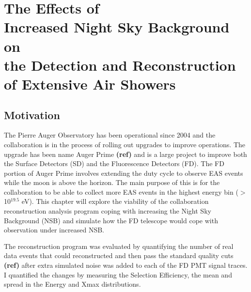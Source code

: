 \chapter[The Effects of Increased NSB on the Detection and Reconstruction of EAS]{\centering The Effects of \\ Increased Night Sky Background on \\ the Detection and Reconstruction \\ of Extensive Air Showers \\}\label{Ch:SelectEff}




\section{Motivation}

The Pierre Auger Observatory has been operational since 2004 and the collaboration  is in the process of rolling out upgrades to improve operations. The upgrade has been name Auger Prime \textbf{(ref)} and is a large project to improve both the Surface Detectors (SD) and the Fluorescence Detectors (FD). The FD portion of Auger Prime involves extending the duty cycle to observe EAS events while the moon is above the horizon. The main purpose of this is for the collaboration to be able to collect more EAS events in the highest energy bin ($>$ 10$^{19.5}$ eV). This chapter will explore the viability of the collaboration reconstruction analysis program coping with increasing the Night Sky Background (NSB) and simulate how the FD telescope would cope with observation under increased NSB. 

The reconstruction program was evaluated by quantifying the number of real data events that could reconstructed and then pass the standard quality cuts \textbf{(ref)} after extra simulated noise was added to each of the FD PMT signal traces. I quantified the changes by measuring the Selection Efficiency, the mean and spread in the Energy and Xmax distributions. 



